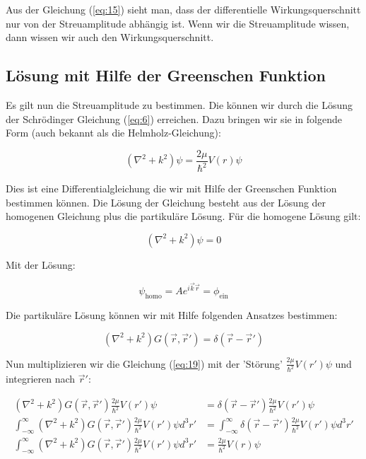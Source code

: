Aus der Gleichung (\ref{eq:15}) sieht man, dass der differentielle Wirkungsquerschnitt nur von der Streuamplitude abhängig ist. Wenn wir die Streuamplitude wissen, dann wissen wir auch den Wirkungsquerschnitt.



\subsection{Lösung mit Hilfe der Greenschen Funktion}


Es gilt nun die Streuamplitude zu bestimmen. Die können wir durch die Lösung der Schrödinger Gleichung (\ref{eq:6})  erreichen. Dazu bringen wir sie in folgende Form (auch bekannt als die Helmholz-Gleichung):

\begin{equation}
  \label{eq:16}
  (\nabla^2 + k^2)\psi = \frac{2\mu}{\hbar^2}V(r)\psi
\end{equation}

Dies ist eine Differentialgleichung die wir mit Hilfe der Greenschen Funktion bestimmen können. Die Lösung der Gleichung besteht aus der Lösung der homogenen Gleichung plus die partikuläre Lösung. Für die homogene Lösung gilt:

\begin{equation}
  \label{eq:17}
   (\nabla^2 + k^2)\psi = 0
\end{equation}

Mit der Lösung:

\begin{equation}
  \label{eq:18}
  \psi_{\text{homo}} =Ae^{i\vec k \vec r} = \phi_{\text{ein}}
\end{equation}

Die partikuläre Lösung können wir mit Hilfe folgenden Ansatzes bestimmen:

\begin{equation}
  \label{eq:19}
   (\nabla^2 + k^2) G(\vec r,\vec r') = \delta(\vec r-\vec r')
\end{equation}

Nun multiplizieren wir die Gleichung (\ref{eq:19}) mit der 'Störung' \(\frac{2\mu}{\hbar^2}V(r')\psi\) und integrieren nach \(\vec r'\):

\begin{align}
  \label{eq:20}
   (\nabla^2 + k^2) G(\vec r,\vec r')\frac{2\mu}{\hbar^2}V(r')\psi &= \delta(\vec r-\vec r')\frac{2\mu}{\hbar^2}V(r')\psi \\
\int_{-\infty}^\infty (\nabla^2 + k^2) G(\vec r,\vec r')\frac{2\mu}{\hbar^2}V(r')\psi d^3 r' &=\int_{-\infty}^\infty \delta(\vec r-\vec r')\frac{2\mu}{\hbar^2}V(r')\psi d^3 r' \\
\int_{-\infty}^\infty (\nabla^2 + k^2) G(\vec r,\vec r')\frac{2\mu}{\hbar^2}V(r')\psi d^3 r' &=\frac{2\mu}{\hbar^2}V(r)\psi
\end{align}

